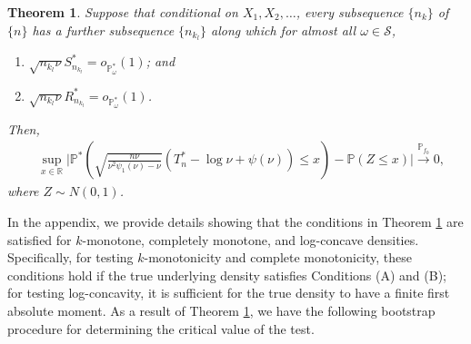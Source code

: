 \documentclass[12pt,letterpaper, twoside, openany]{article}
\theoremstyle{plain}
\newtheorem{theorem}{Theorem}[section]
\begin{document}
		
		\begin{theorem}\label{thm:bootstrap_general}
			Suppose that conditional on $X_1,X_2,\ldots$, every subsequence $\{n_k\}$ of $\{n\}$ has a further subsequence $\{n_{k_l}\}$ along which for almost all $\omega \in \mathcal{S}$,
			\begin{enumerate}%
				\item [(i)]
				$\sqrt{n_{k_l} \nu} S^*_{n_{k_l}} = o_{\mathbb{P}^*_\omega}(1)$; and
				\item [(ii)] $\sqrt{n_{k_l}\nu} R^*_{n_{k_l}} =  o_{\mathbb{P}^*_\omega}(1)$.
			\end{enumerate} 
   Then,	\begin{align}\label{eq:bootstrap_consistencty_general}
	&			\sup_{x \in \mathbb{R}} \bigg| \mathbb{P}^*\left( \sqrt{ \frac{n\nu}{\nu^2\psi_1(\nu)-\nu}} \left( T_n^* -  \log \nu +  \psi(\nu) \right)  \leq x\right)  - \mathbb{P}\left( Z \leq x \right) \bigg| \stackrel{\mathbb{P}_{f_0}}{\rightarrow} 0,
			\end{align}
			where $Z\sim N\left(0, 1 \right)$.
		\end{theorem}
		
		In the appendix, we provide details showing that the conditions in Theorem \ref{thm:bootstrap_general} are satisfied for $k$-monotone, completely monotone, and log-concave densities. Specifically, for testing $k$-monotonicity and complete monotonicity, these conditions hold if the true underlying density satisfies Conditions (A) and (B); for testing log-concavity, it is sufficient for the true density to have a finite first absolute moment.  As a result of Theorem \ref{thm:bootstrap_general}, we have the following bootstrap procedure for determining the critical value of the test. 
	
\end{document}
